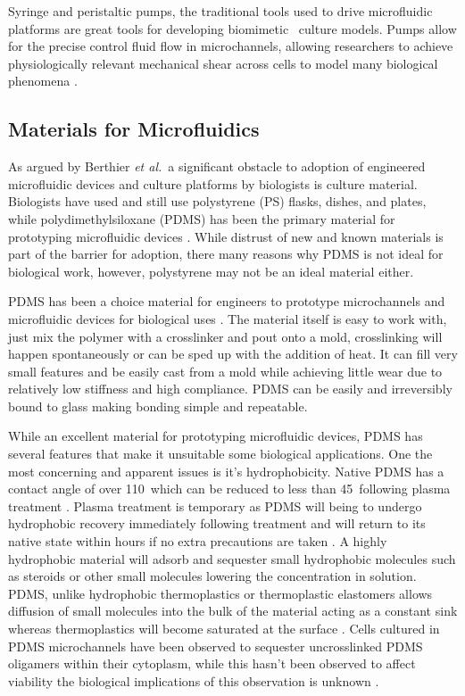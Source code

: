 Syringe and peristaltic pumps, the traditional tools used to drive microfluidic platforms are great tools for developing biomimetic \invitro\ culture models. Pumps allow for the precise control fluid flow in microchannels, allowing researchers to achieve physiologically relevant mechanical shear across cells to model many biological phenomena \cite{}. 

\subsection{Materials for Microfluidics}
As argued by Berthier \textit{et al.}\ a significant obstacle to adoption of engineered microfluidic devices and culture platforms by biologists is culture material. Biologists have used and still use polystyrene (PS) flasks, dishes, and plates, while polydimethylsiloxane (PDMS) has been the primary material for prototyping microfluidic devices \cite{Berthier2012} . While distrust of new and known materials is part of the barrier for adoption, there many reasons why PDMS is not ideal for biological work, however, polystyrene may not be an ideal material either.

PDMS has been a choice material for engineers to prototype microchannels and microfluidic devices for biological uses \cite{Sia2003a}. The material itself is easy to work with, just mix the polymer with a crosslinker and pout onto a mold, crosslinking will happen spontaneously or can be sped up with the addition of heat. It can fill very small features and be easily cast from a mold while achieving little wear due to relatively low stiffness and high compliance. PDMS can be easily and irreversibly bound to glass making bonding simple and repeatable. 

While an excellent material for prototyping microfluidic devices, PDMS has several features that make it unsuitable some biological applications. One the most concerning and apparent issues is it's hydrophobicity. Native PDMS has a contact angle of over 110\textdegree\, which can be reduced to less than 45\textdegree\ following plasma treatment \cite{Mata2005CharacterizationMicro/Nanosystems}. Plasma treatment is temporary as PDMS will being to undergo hydrophobic recovery immediately following treatment and will return to its native state within hours if no extra precautions are taken \cite{Eddington2006ThermalPolydimethylsiloxane}. A highly hydrophobic material will adsorb and sequester small hydrophobic molecules such as steroids or other small molecules lowering the concentration in solution. PDMS, unlike hydrophobic thermoplastics or thermoplastic elastomers allows diffusion of small molecules into the bulk of the material acting as a constant sink whereas thermoplastics will become saturated at the surface \cite{Toepke2006, Regehr2009,Borysiak2013b}. Cells cultured in PDMS microchannels have been observed to sequester uncrosslinked PDMS oligamers within their cytoplasm, while this hasn't been observed to affect viability the biological implications of this observation is unknown \cite{Regehr2009}.

